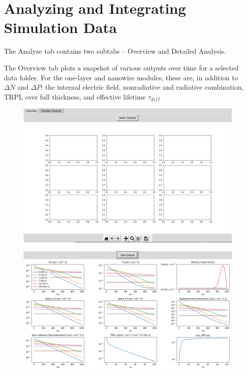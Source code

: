\documentclass[11pt,letterpaper,titlepage]{article}
\begin{document}
	\newpage
	\section{Analyzing and Integrating Simulation Data}
		\par The Analyze tab contains two subtabs – Overview and Detailed Analysis.
		
		\par The Overview tab plots a snapshot of various outputs over time for a selected data folder. For the one-layer and nanowire modules, these are, in addition to $\Delta N$ and $\Delta P$: the internal electric field, nonradiative and radiative combination, TRPL over full thickness, and effective lifetime $\tau_{diff}$
		
		\begin{figure}[H]
			\label{fig:overview_blank}
			\centering
			\includegraphics[scale=0.8]{"overview_blank"}
		\end{figure}
	
		\begin{figure}[H]
			\label{fig:overview_example}
			\centering
			\includegraphics[scale=0.4]{"overview_example"}
		\end{figure}
	
\end{document}
